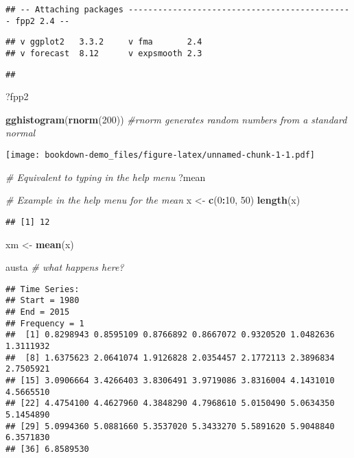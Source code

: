 \documentclass[]{book}
\newenvironment{Shaded}{\begin{snugshade}}{\end{snugshade}}
\newcommand{\CommentTok}[1]{\textcolor[rgb]{0.56,0.35,0.01}{\textit{#1}}}
\newcommand{\DecValTok}[1]{\textcolor[rgb]{0.00,0.00,0.81}{#1}}
\newcommand{\KeywordTok}[1]{\textcolor[rgb]{0.13,0.29,0.53}{\textbf{#1}}}
\newcommand{\NormalTok}[1]{#1}
\newcommand{\OperatorTok}[1]{\textcolor[rgb]{0.81,0.36,0.00}{\textbf{#1}}}
\newcommand{\StringTok}[1]{\textcolor[rgb]{0.31,0.60,0.02}{#1}}
\begin{document}
\begin{verbatim}
## -- Attaching packages ---------------------------------------------- fpp2 2.4 --
\end{verbatim}

\begin{verbatim}
## v ggplot2   3.3.2     v fma       2.4  
## v forecast  8.12      v expsmooth 2.3
\end{verbatim}

\begin{verbatim}
## 
\end{verbatim}

\begin{Shaded}
\begin{Highlighting}[]
\NormalTok{?fpp2 }

\KeywordTok{gghistogram}\NormalTok{(}\KeywordTok{rnorm}\NormalTok{(}\DecValTok{200}\NormalTok{)) }\CommentTok{#rnorm generates random numbers from a standard normal}
\end{Highlighting}
\end{Shaded}

\texttt{[image: bookdown-demo\_files/figure-latex/unnamed-chunk-1-1.pdf]}

\begin{Shaded}
\begin{Highlighting}[]
\CommentTok{# Equivalent to typing in the help menu }
\NormalTok{?mean }

\CommentTok{# Example in the help menu for the mean}
\NormalTok{x <-}\StringTok{ }\KeywordTok{c}\NormalTok{(}\DecValTok{0}\OperatorTok{:}\DecValTok{10}\NormalTok{, }\DecValTok{50}\NormalTok{) }
\KeywordTok{length}\NormalTok{(x)}
\end{Highlighting}
\end{Shaded}

\begin{verbatim}
## [1] 12
\end{verbatim}

\begin{Shaded}
\begin{Highlighting}[]
\NormalTok{xm <-}\StringTok{ }\KeywordTok{mean}\NormalTok{(x) }


\NormalTok{austa }\CommentTok{# what happens here? }
\end{Highlighting}
\end{Shaded}

\begin{verbatim}
## Time Series:
## Start = 1980 
## End = 2015 
## Frequency = 1 
##  [1] 0.8298943 0.8595109 0.8766892 0.8667072 0.9320520 1.0482636 1.3111932
##  [8] 1.6375623 2.0641074 1.9126828 2.0354457 2.1772113 2.3896834 2.7505921
## [15] 3.0906664 3.4266403 3.8306491 3.9719086 3.8316004 4.1431010 4.5665510
## [22] 4.4754100 4.4627960 4.3848290 4.7968610 5.0150490 5.0634350 5.1454890
## [29] 5.0994360 5.0881660 5.3537020 5.3433270 5.5891620 5.9048840 6.3571830
## [36] 6.8589530
\end{verbatim}
\end{document}
